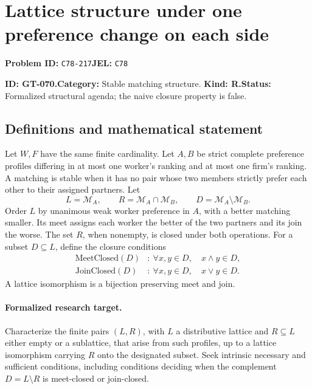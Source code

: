 \documentclass[11pt,a4paper]{article}
\begin{document}
\section*{Lattice structure under one preference change on each side}
\textbf{Problem ID:} \texttt{C78-217}\quad \textbf{JEL:} \texttt{C78}\par
\label{problem:OP-0200}
\label{game:GT-070}
{\sffamily\small\color{muted}
\noindent\textbf{ID: GT-070.}\quad\textbf{Category:} Stable matching structure.
\quad\textbf{Kind: R.}\quad\textbf{Status:} Formalized structural agenda;
the naive closure property is false.
\par}
\subsection*{Definitions and mathematical statement}
Let \(W,F\) have the same finite cardinality. Let \(A,B\) be strict
complete preference profiles differing in at most one worker's ranking
and at most one firm's ranking. A matching is stable when it has no
pair whose two members strictly prefer each other to their assigned
partners. Let
\[
 L=\mathcal M_A,\qquad R=\mathcal M_A\cap\mathcal M_B,\qquad
 D=\mathcal M_A\setminus\mathcal M_B.
\]
Order \(L\) by unanimous weak worker preference in \(A\), with a better
matching smaller. Its meet assigns each worker the better of the two
partners and its join the worse. The set \(R\), when nonempty, is closed
under both operations. For a subset \(D\subseteq L\), define the closure
conditions
\[
 \begin{aligned}
 \mathrm{MeetClosed}(D)&:\ 
       \forall x,y\in D,\quad x\wedge y\in D,\\
 \mathrm{JoinClosed}(D)&:\ 
       \forall x,y\in D,\quad x\vee y\in D.
 \end{aligned}
\]
A lattice isomorphism is a bijection preserving meet and join.

\paragraph{Formalized research target.}
Characterize the finite pairs \((L,R)\), with \(L\) a distributive
lattice and \(R\subseteq L\) either empty or a sublattice, that arise
from such profiles, up to a lattice isomorphism carrying \(R\) onto
the designated subset. Seek intrinsic necessary and sufficient
conditions, including conditions deciding when the complement
\(D=L\setminus R\) is meet-closed or join-closed.
\end{document}
